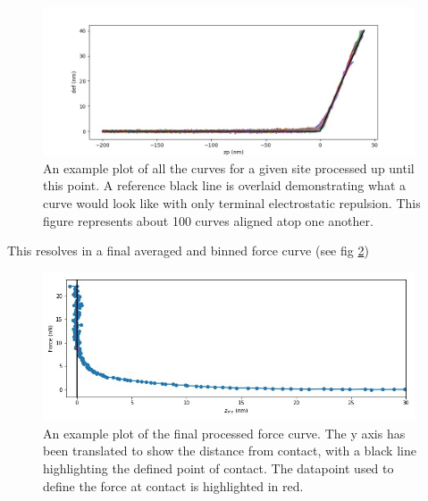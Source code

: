 \begin{figure}[h!]     %
        \begin{center}
          \includegraphics[width=110mm]{chapter4/proc_force_sep_mastercurve.jpg}
\end{center}
\caption{An example plot of all the curves for a given site processed up until this point. A reference black line is overlaid demonstrating what a curve would look like with only terminal electrostatic repulsion. This figure represents about 100 curves aligned atop one another.}
\label{fig:proc_force_sep_mastercurve}                 %
\end{figure}






This resolves in a final averaged and binned force curve (see fig \ref{fig:EgFinalCurve})

\begin{figure}[h!!!]     %
        \begin{center}
          \includegraphics[width=110mm]{chapter4/EgFinalCurve.jpg}
\end{center}
\caption{An example plot of the final processed force curve. The y axis has been translated to show the distance from contact, with a black line highlighting the defined point of contact. The datapoint used to define the force at contact is highlighted in red.}
\label{fig:EgFinalCurve}                 %
\end{figure}

